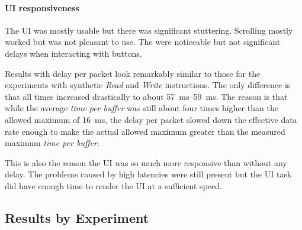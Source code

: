 \paragraph{UI responsiveness}

The UI was mostly usable but there was significant stuttering. Scrolling mostly worked but was not
pleasant to use. The were noticeable but not significant delays when interacting with buttons. 
\bigbreak

Results with delay per packet look remarkably similar to those for the experiments with synthetic
\textit{Read} and \textit{Write} instructions. The only difference is that all times increased
drastically to about \SIrange{57}{59}{\milli\second}. The reason is that while the average
\textit{time per buffer} was still about four times higher than the allowed maximum of
\SI{16}{\milli\second}, the delay per packet slowed down the effective data rate enough to make the
actual allowed maximum greater than the measured maximum \textit{time per buffer}.

This is also the reason the UI was so much more responsive than without any delay. The problems
caused by high latencies were still present but the UI task did have enough time to render the UI
at a sufficient speed.

\subsection{Results by Experiment}
\label{evaluation/results/results-by-experiment}

